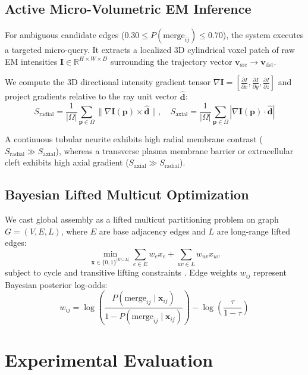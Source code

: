 \documentclass[10pt,twocolumn,letterpaper]{article}
\begin{document}
\subsection{Active Micro-Volumetric EM Inference}
For ambiguous candidate edges ($0.30 \le P(\text{merge}_{ij}) \le 0.70$), the system executes a targeted micro-query. It extracts a localized 3D cylindrical voxel patch of raw EM intensities $\mathbf{I} \in \mathbb{R}^{H \times W \times D}$ surrounding the trajectory vector $\mathbf{v}_{\text{src}} \to \mathbf{v}_{\text{dst}}$.

We compute the 3D directional intensity gradient tensor $\nabla \mathbf{I} = \left[\frac{\partial I}{\partial x}, \frac{\partial I}{\partial y}, \frac{\partial I}{\partial z}\right]$ and project gradients relative to the ray unit vector $\hat{\mathbf{d}}$:
\begin{equation}
S_{\text{radial}} = \frac{1}{|\Omega|} \sum_{\mathbf{p} \in \Omega} \|\nabla \mathbf{I}(\mathbf{p}) \times \hat{\mathbf{d}}\|, \quad S_{\text{axial}} = \frac{1}{|\Omega|} \sum_{\mathbf{p} \in \Omega} |\nabla \mathbf{I}(\mathbf{p}) \cdot \hat{\mathbf{d}}|
\end{equation}

A continuous tubular neurite exhibits high radial membrane contrast ($S_{\text{radial}} \gg S_{\text{axial}}$), whereas a transverse plasma membrane barrier or extracellular cleft exhibits high axial gradient ($S_{\text{axial}} \gg S_{\text{radial}}$).

\subsection{Bayesian Lifted Multicut Optimization}
We cast global assembly as a lifted multicut partitioning problem on graph $G = (V, E, L)$, where $E$ are base adjacency edges and $L$ are long-range lifted edges:
\begin{equation}
\min_{\mathbf{x} \in \{0, 1\}^{|E \cup L|}} \sum_{e \in E} w_e x_e + \sum_{uv \in L} w_{uv} x_{uv}
\end{equation}
subject to cycle and transitive lifting constraints \cite{beier2017}. Edge weights $w_{ij}$ represent Bayesian posterior log-odds:
\begin{equation}
w_{ij} = \log\left(\frac{P(\text{merge}_{ij} \mid \mathbf{x}_{ij})}{1 - P(\text{merge}_{ij} \mid \mathbf{x}_{ij})}\right) - \log\left(\frac{\tau}{1 - \tau}\right)
\end{equation}

\section{Experimental Evaluation}
\end{document}
